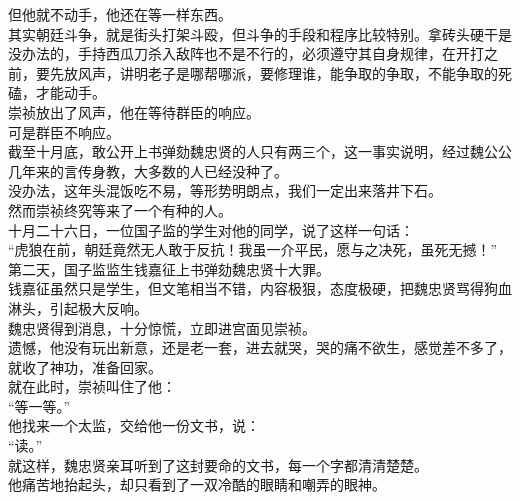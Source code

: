 \begin{multicols}{\theparacolNo}
但他就不动手，他还在等一样东西。\\

其实朝廷斗争，就是街头打架斗殴，但斗争的手段和程序比较特别。拿砖头硬干是没办法的，手持西瓜刀杀入敌阵也不是不行的，必须遵守其自身规律，在开打之前，要先放风声，讲明老子是哪帮哪派，要修理谁，能争取的争取，不能争取的死磕，才能动手。\\

崇祯放出了风声，他在等待群臣的响应。\\

可是群臣不响应。\\

截至十月底，敢公开上书弹劾魏忠贤的人只有两三个，这一事实说明，经过魏公公几年来的言传身教，大多数的人已经没种了。\\

没办法，这年头混饭吃不易，等形势明朗点，我们一定出来落井下石。\\

然而崇祯终究等来了一个有种的人。\\

十月二十六日，一位国子监的学生对他的同学，说了这样一句话：\\

“虎狼在前，朝廷竟然无人敢于反抗！我虽一介平民，愿与之决死，虽死无撼！”\\

第二天，国子监监生钱嘉征上书弹劾魏忠贤十大罪。\\

钱嘉征虽然只是学生，但文笔相当不错，内容极狠，态度极硬，把魏忠贤骂得狗血淋头，引起极大反响。\\

魏忠贤得到消息，十分惊慌，立即进宫面见崇祯。\\

遗憾，他没有玩出新意，还是老一套，进去就哭，哭的痛不欲生，感觉差不多了，就收了神功，准备回家。\\

就在此时，崇祯叫住了他：\\

“等一等。”\\

他找来一个太监，交给他一份文书，说：\\

“读。”\\

就这样，魏忠贤亲耳听到了这封要命的文书，每一个字都清清楚楚。\\

他痛苦地抬起头，却只看到了一双冷酷的眼睛和嘲弄的眼神。\\


\end{multicols}
